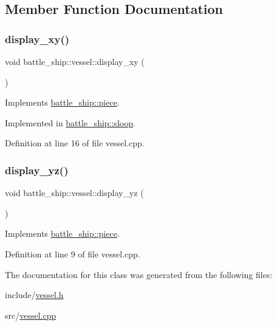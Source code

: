 \subsection{Member Function Documentation}
\mbox{\label{classbattle__ship_1_1vessel_a9e72e4a65466cbfe4c550d3741dbe824}} 
\subsubsection{\texorpdfstring{display\+\_\+xy()}{display\_xy()}}
{\footnotesize\ttfamily void battle\+\_\+ship\+::vessel\+::display\+\_\+xy (\begin{DoxyParamCaption}{ }\end{DoxyParamCaption})\hspace{0.3cm}{\ttfamily [pure virtual]}}



Implements \hyperlink{classbattle__ship_1_1piece_a0f900b13641277ae9e809e4baa5c8c10}{battle\+\_\+ship\+::piece}.



Implemented in \hyperlink{classbattle__ship_1_1sloop_a4448d666d4d7a4524618ad88e4dc802e}{battle\+\_\+ship\+::sloop}.



Definition at line 16 of file vessel.\+cpp.

\mbox{\label{classbattle__ship_1_1vessel_ad573c7ceefb8a2ec34e353d57468d4f2}} 
\subsubsection{\texorpdfstring{display\+\_\+yz()}{display\_yz()}}
{\footnotesize\ttfamily void battle\+\_\+ship\+::vessel\+::display\+\_\+yz (\begin{DoxyParamCaption}{ }\end{DoxyParamCaption})\hspace{0.3cm}{\ttfamily [virtual]}}



Implements \hyperlink{classbattle__ship_1_1piece_ad46ddc76d6e682a4f1fc8965a0c7813c}{battle\+\_\+ship\+::piece}.



Definition at line 9 of file vessel.\+cpp.



The documentation for this class was generated from the following files\+:\begin{DoxyCompactItemize}
\item 
include/\hyperlink{vessel_8h}{vessel.\+h}\item 
src/\hyperlink{vessel_8cpp}{vessel.\+cpp}\end{DoxyCompactItemize}
